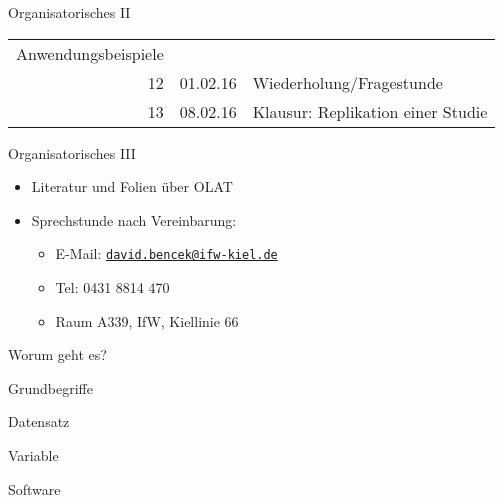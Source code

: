 \documentclass[ignorenonframetext,]{beamer}
\begin{document}
\begin{frame}{Organisatorisches II}
\begin{longtable}[c]{@{}rll@{}}
\begin{minipage}[t]{0.58\columnwidth}\raggedright\strut
Anwendungsbeispiele
\strut\end{minipage}\tabularnewline
\begin{minipage}[t]{0.17\columnwidth}\raggedleft\strut
12
\strut\end{minipage} &
\begin{minipage}[t]{0.17\columnwidth}\raggedright\strut
01.02.16
\strut\end{minipage} &
\begin{minipage}[t]{0.58\columnwidth}\raggedright\strut
Wiederholung/Fragestunde
\strut\end{minipage}\tabularnewline
\begin{minipage}[t]{0.17\columnwidth}\raggedleft\strut
13
\strut\end{minipage} &
\begin{minipage}[t]{0.17\columnwidth}\raggedright\strut
08.02.16
\strut\end{minipage} &
\begin{minipage}[t]{0.58\columnwidth}\raggedright\strut
Klausur: Replikation einer Studie
\strut\end{minipage}\tabularnewline
\bottomrule
\end{longtable}

\end{frame}

\begin{frame}{Organisatorisches III}

\begin{itemize}
\item
  Literatur und Folien über OLAT
\item
  Sprechstunde nach Vereinbarung:

  \begin{itemize}
  \itemsep1pt\parskip0pt
  \item
    E-Mail:
    \href{mailto:david.bencek@ifw-kiel.de}{\nolinkurl{david.bencek@ifw-kiel.de}}
  \item
    Tel: 0431 8814 470
  \item
    Raum A339, IfW, Kiellinie 66
  \end{itemize}
\end{itemize}

\end{frame}

\begin{frame}{Worum geht es?}

\end{frame}

\begin{frame}{Grundbegriffe}

\end{frame}

\begin{frame}{Datensatz}

\end{frame}

\begin{frame}{Variable}

\end{frame}

\begin{frame}{Software}

\end{frame}
\end{document}
